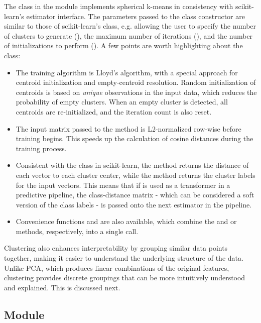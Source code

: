 \documentclass[article]{jss}
\begin{document}
The  class in the  module implements spherical k-means in consistency with scikit-learn's estimator interface. The parameters passed to the class constructor are similar to those of scikit-learn's  class, e.g. allowing the user to specify the number of clusters to generate (), the maximum number of iterations (), and the number of initializations to perform (). A few points are worth highlighting about the  class:
\begin{itemize}
  \item The training algorithm is Lloyd's algorithm, with a special approach for centroid initialization and empty-centroid resolution. Random initialization of centroids is based on \textit{unique} observations in the input data, which reduces the probability of empty clusters. When an empty cluster is detected, all centroids are re-initialized, and the iteration count is also reset.
  \item The input matrix  passed to the  method is L2-normalized row-wise before training begins. This speeds up the calculation of cosine distances during the training process.
  \item Consistent with the  class in scikit-learn, the  method returns the distance of each vector to each cluster center, while the  method returns the cluster labels for the input vectors. This means that if  is used as a transformer in a predictive pipeline, the class-distance matrix - which can be considered a soft version of the class labels - is passed onto the next estimator in the pipeline.
  \item Convenience functions  and  are also available, which combine the  and  or  methods, respectively, into a single call.
\end{itemize}

Clustering also enhances interpretability by grouping similar data points together, making it easier to understand the underlying structure of the data. Unlike PCA, which produces linear combinations of the original features, clustering provides discrete groupings that can be more intuitively understood and explained. This is discussed next.

\subsection[explain Module]{ Module}\label{subsec:module-explain}
\end{document}
